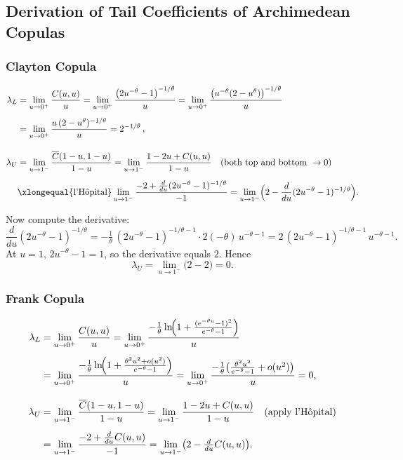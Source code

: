 \documentclass[11pt]{article}
\begin{document}
\subsection{Derivation of Tail Coefficients of Archimedean Copulas}
\subsubsection{Clayton Copula}
\begin{align*}
\lambda_L
&= \lim_{u\to0^+}\frac{C(u,u)}{u}
= \lim_{u\to0^+}\frac{\bigl(2u^{-\theta}-1\bigr)^{-1/\theta}}{u}
= \lim_{u\to0^+}\frac{\bigl(u^{-\theta}(2 - u^\theta)\bigr)^{-1/\theta}}{u} \\[0.5em]
&= \lim_{u\to0^+}\frac{u\,(2 - u^\theta)^{-1/\theta}}{u}
= 2^{-1/\theta}\,,
\\[1em]
\lambda_U
&= \lim_{u\to1^-}\frac{\overline{C}(1-u,1-u)}{1-u}
= \lim_{u\to1^-}\frac{1 - 2u + C(u,u)}{1-u}
\quad (\text{both top and bottom }\to0)\\[0.5em]
&\xlongequal{\text{l’Hôpital}}
\lim_{u\to1^-}
\frac{-2 + \frac{d}{du}(2u^{-\theta}-1)^{-1/\theta}}{-1}
= \lim_{u\to1^-}\Bigl(2 - \frac{d}{du}(2u^{-\theta}-1)^{-1/\theta}\Bigr).
\end{align*}

Now compute the derivative:
\[
\frac{d}{du}(2u^{-\theta}-1)^{-1/\theta}
= -\tfrac1\theta\,(2u^{-\theta}-1)^{-1/\theta-1}
  \cdot 2(-\theta)\,u^{-\theta-1}
= 2\,(2u^{-\theta}-1)^{-1/\theta-1}\,u^{-\theta-1}.
\]
At \(u=1\), \(2u^{-\theta}-1=1\), so the derivative equals \(2\). Hence
\[
\lambda_U
= \lim_{u\to1^-}\bigl(2 - 2\bigr)
= 0.
\]

\subsubsection{Frank Copula}

\begin{align*}
\lambda_L
&=\lim_{u\to0^+}\frac{C(u,u)}{u}
=\lim_{u\to0^+}\frac{-\tfrac1\theta
  \ln\!\Bigl(1+\frac{(e^{-\theta u}-1)^2}{e^{-\theta}-1}\Bigr)}{u}\\[0.5em]
&=\lim_{u\to0^+}\frac{-\tfrac1\theta
  \ln\!\Bigl(1+\frac{\theta^2u^2+o(u^2)}{e^{-\theta}-1}\Bigr)}{u}
=\lim_{u\to0^+}\frac{-\tfrac1\theta
  \bigl(\frac{\theta^2u^2}{e^{-\theta}-1}+o(u^2)\bigr)}{u}
=0,
\\[1em]
\lambda_U
&=\lim_{u\to1^-}\frac{\overline C(1-u,1-u)}{1-u}
=\lim_{u\to1^-}\frac{1-2u+C(u,u)}{1-u}
\quad\text{(apply l’Hôpital)}\\[0.5em]
&=\lim_{u\to1^-}\frac{-2+\frac{d}{du}C(u,u)}{-1}
=\lim_{u\to1^-}\bigl(2-\tfrac{d}{du}C(u,u)\bigr).
\end{align*}
\end{document}
